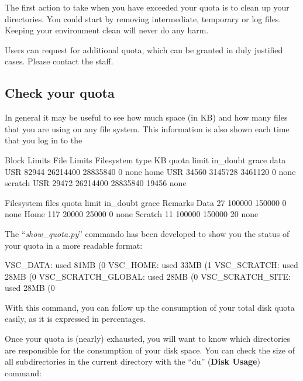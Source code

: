  The first action to take when you have exceeded your quota is
to clean up your directories. You could start by removing intermediate,
temporary or log files.  Keeping your environment clean will never do any harm.

 Users can request for additional quota, which can be granted in
duly justified cases. Please contact the \hpc staff.

\subsection{Check your quota}

In general it may be useful to see how much space (in KB) and how many files
that you are using on any file system.  This information is also shown each
time that you log in to the \hpc

\ifantwerpen
\begin{prompt}
                         Block Limits                                    \textbar      File Limits
Filesystem type KB  quota  limit  in\_doubt   grace
data              USR  82944  26214400 28835840 0       none
home            USR 34560  3145728 3461120 0       none
scratch         USR 29472  26214400 28835840 19456       none

Filesystem files quota  limit  in_doubt grace  Remarks
Data  27 100000 150000 0  none
Home  117 20000  25000  0  none
Scratch 11 100000  150000 20  none
\end{prompt}
\fi

The ``\emph{show\_quota.py}'' commando has been developed to show you the
status of your quota in a more readable format:

\begin{prompt}
VSC_DATA:    used 81MB (0%
VSC_HOME:    used 33MB (1%
VSC_SCRATCH:   used 28MB (0%
VSC_SCRATCH\_GLOBAL: used 28MB (0%
VSC_SCRATCH\_SITE:   used 28MB (0%
\end{prompt}

With this command, you can follow up the consumption of your total disk quota
easily, as it is expressed in percentages.

Once your quota is (nearly) exhausted, you will want to know which directories
are responsible for the consumption of your disk space. You can check the size
of all subdirectories in the current directory with the ``du'' (\textbf{Disk
Usage}) command:

